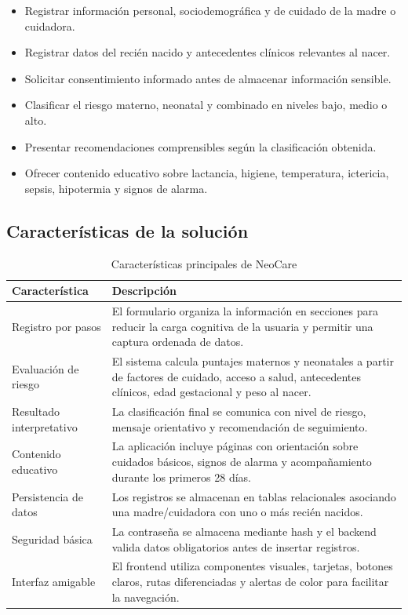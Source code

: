 \documentclass[12pt,letterpaper]{article}
\begin{document}
\begin{itemize}
    \item Registrar información personal, sociodemográfica y de cuidado de la madre o cuidadora.
    \item Registrar datos del recién nacido y antecedentes clínicos relevantes al nacer.
    \item Solicitar consentimiento informado antes de almacenar información sensible.
    \item Clasificar el riesgo materno, neonatal y combinado en niveles bajo, medio o alto.
    \item Presentar recomendaciones comprensibles según la clasificación obtenida.
    \item Ofrecer contenido educativo sobre lactancia, higiene, temperatura, ictericia, sepsis, hipotermia y signos de alarma.
\end{itemize}

\subsection{Características de la solución}

\begin{longtable}{p{}p{}}
\caption{Características principales de NeoCare}\\
\toprule
\textbf{Característica} & \textbf{Descripción}\\
\midrule
Registro por pasos & El formulario organiza la información en secciones para reducir la carga cognitiva de la usuaria y permitir una captura ordenada de datos.\\
Evaluación de riesgo & El sistema calcula puntajes maternos y neonatales a partir de factores de cuidado, acceso a salud, antecedentes clínicos, edad gestacional y peso al nacer.\\
Resultado interpretativo & La clasificación final se comunica con nivel de riesgo, mensaje orientativo y recomendación de seguimiento.\\
Contenido educativo & La aplicación incluye páginas con orientación sobre cuidados básicos, signos de alarma y acompañamiento durante los primeros 28 días.\\
Persistencia de datos & Los registros se almacenan en tablas relacionales asociando una madre/cuidadora con uno o más recién nacidos.\\
Seguridad básica & La contraseña se almacena mediante hash y el backend valida datos obligatorios antes de insertar registros.\\
Interfaz amigable & El frontend utiliza componentes visuales, tarjetas, botones claros, rutas diferenciadas y alertas de color para facilitar la navegación.\\
\bottomrule
\end{longtable}
\end{document}
